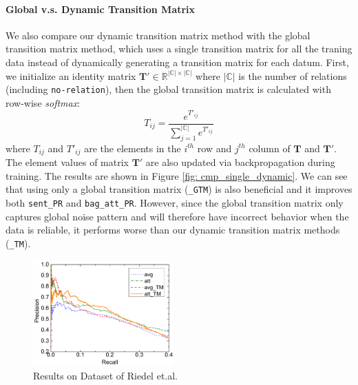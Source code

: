 \paragraph{Global v.s. Dynamic Transition Matrix}
We also compare our dynamic transition matrix method with the global transition matrix method, 
which uses a single transition matrix for all the traning data instead of dynamically generating a transition matrix for each datum.
First, we initialize an identity matrix $\mathbf{T}'\in\mathbb{R}^{|\mathbb{C}|\times |\mathbb{C}|}$ where $|\mathbb{C}|$ is the number of relations (including \texttt{no-relation}), then the global transition matrix is calculated with row-wise \emph{softmax}:
\begin{equation}
\label{shared_mat}
T_{ij} = \frac{e^{T'_{ij}}}{\sum_{j=1}^{|\mathbb{C}|}{e^{T'_{ij}}}}
\end{equation}
where $T_{ij}$ and $T'_{ij}$ are the elements in the $i^{th}$ row and $j^{th}$ column of $\mathbf{T}$ and $\mathbf{T}'$. The element values of matrix $\mathbf{T}'$ are also updated via backpropagation during training.
The results are shown in Figure \ref{fig: cmp_single_dynamic}.
We can see that using only a global transition matrix (\texttt{\_GTM}) is also beneficial and it improves both \texttt{sent\_PR} and \texttt{bag\_att\_PR}. However, since the global transition matrix only captures global noise pattern and will therefore have incorrect behavior when the data is reliable, it performs worse than our dynamic transition matrix methods (\texttt{\_TM}).

\begin{figure}[t!]
\includegraphics[width=0.48\textwidth]{figures/re_att_avg_cmp_exp.pdf}
\caption{Results on Dataset of Riedel et.al.}
\label{fig: Riedel_res}
\end{figure}

